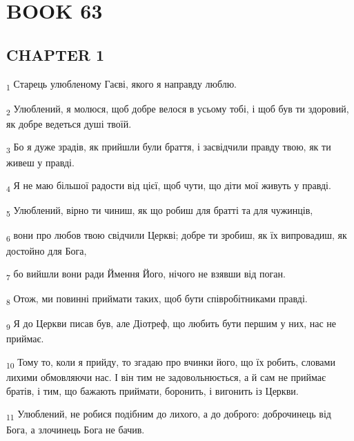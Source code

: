 \section{BOOK 63}
\subsection{CHAPTER 1}
\begin{tcolorbox}
\textsubscript{1} Старець улюбленому Гаєві, якого я направду люблю.
\end{tcolorbox}
\begin{tcolorbox}
\textsubscript{2} Улюблений, я молюся, щоб добре велося в усьому тобі, і щоб був ти здоровий, як добре ведеться душі твоїй.
\end{tcolorbox}
\begin{tcolorbox}
\textsubscript{3} Бо я дуже зрадів, як прийшли були браття, і засвідчили правду твою, як ти живеш у правді.
\end{tcolorbox}
\begin{tcolorbox}
\textsubscript{4} Я не маю більшої радости від цієї, щоб чути, що діти мої живуть у правді.
\end{tcolorbox}
\begin{tcolorbox}
\textsubscript{5} Улюблений, вірно ти чиниш, як що робиш для братті та для чужинців,
\end{tcolorbox}
\begin{tcolorbox}
\textsubscript{6} вони про любов твою свідчили Церкві; добре ти зробиш, як їх випровадиш, як достойно для Бога,
\end{tcolorbox}
\begin{tcolorbox}
\textsubscript{7} бо вийшли вони ради Ймення Його, нічого не взявши від поган.
\end{tcolorbox}
\begin{tcolorbox}
\textsubscript{8} Отож, ми повинні приймати таких, щоб бути співробітниками правді.
\end{tcolorbox}
\begin{tcolorbox}
\textsubscript{9} Я до Церкви писав був, але Діотреф, що любить бути першим у них, нас не приймає.
\end{tcolorbox}
\begin{tcolorbox}
\textsubscript{10} Тому то, коли я прийду, то згадаю про вчинки його, що їх робить, словами лихими обмовляючи нас. І він тим не задовольнюється, а й сам не приймає братів, і тим, що бажають приймати, боронить, і вигонить із Церкви.
\end{tcolorbox}
\begin{tcolorbox}
\textsubscript{11} Улюблений, не робися подібним до лихого, а до доброго: доброчинець від Бога, а злочинець Бога не бачив.
\end{tcolorbox}
